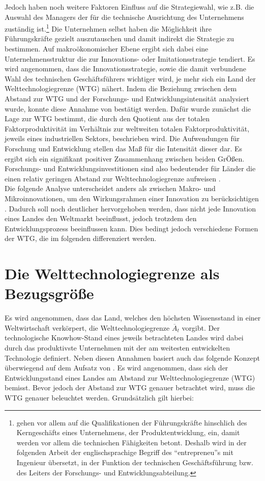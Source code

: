 %
Jedoch haben noch weitere Faktoren Einfluss auf die Strategiewahl, wie z.B. die Auswahl des Managers der für die technische Ausrichtung des Unternehmens zuständig ist.\footnote{\cite{Acemoglu.2006} gehen vor allem auf die Qualifikationen der Führungskräfte hinschlich des Kerngeschäfts eines Unternehmens, der Produktentwicklung, ein, damit werden vor allem die technischen Fähigkeiten betont. Deshalb wird in der folgenden Arbeit der englischsprachige Begriff des "`entrepreneu"'s mit Ingenieur übersetzt, in der Funktion der technischen Geschäftsführung bzw. des Leiters der Forschungs- und Entwicklungsabteilung.} Die Unternehmen selbst haben die Möglichkeit ihre Führungskräfte gezielt auszutauschen und damit indirekt die Strategie zu bestimmen. Auf makroökonomischer Ebene ergibt sich dabei eine Unternehmensstruktur die zur Innovations- oder Imitationsstrategie tendiert. 
%
Es wird angenommen, dass die Innovationsstrategie, sowie die damit verbundene Wahl des technischen Geschäftsführers wichtiger wird, je mehr sich ein Land der Welttechnologiegrenze (WTG) nähert. Indem die Beziehung zwischen dem Abstand zur WTG und der Forschungs- und Entwicklungsintensität analysiert wurde, konnte diese Annahme von \cite{Griffith.2004} bestätigt werden. Dafür wurde zunächst die Lage zur WTG bestimmt, die durch den Quotient aus der totalen Faktorproduktivität im Verhältnis zur weltweiten totalen Faktorproduktivität, jeweils eines industriellen Sektors, beschrieben wird. Die Aufwendungen für Forschung und Entwicklung stellen das Maß für die Intensität dieser dar. Es ergibt sich ein signifikant positiver Zusammenhang zwischen beiden GrÖßen. Forschungs- und Entwicklungsinvestitionen sind also bedeutender für Länder die einen relativ geringen Abstand zur Welttechnologiegrenze aufweisen \cite{Acemoglu.2006}.\\
%
Die folgende Analyse unterscheidet anders als \cite{Acemoglu.2006} zwischen Makro- und Mikroinnovationen, um den Wirkungsrahmen einer Innovation zu berücksichtigen \cite{Mokyr.1990}. Dadurch soll noch deutlicher hervorgehoben werden, dass nicht jede Innovation eines Landes den Weltmarkt beeinflusst, jedoch trotzdem den Entwicklungsprozess beeinflussen kann. Dies bedingt jedoch verschiedene Formen der WTG, die im folgenden differenziert werden.
%
\section{Die Welttechnologiegrenze als Bezugsgröße}\label{WTG}
%
Es wird angenommen, dass das Land, welches den höchsten Wissensstand in einer Weltwirtschaft verkörpert, die Welttechnologiegrenze $\overline {A}_t$ vorgibt. Der technologische Knowhow-Stand eines jeweils betrachteten Landes wird dabei durch das produktivste Unternehmen mit der am weitesten entwickelten Technologie definiert. 
Neben diesen Annahmen basiert auch das folgende Konzept überwiegend auf dem Aufsatz von \cite{Acemoglu.2006}. Es wird angenommen, dass sich der Entwicklungsstand eines Landes am Abstand zur Welttechnologiegrenze (WTG) bemisst. Bevor jedoch der Abstand zur WTG genauer betrachtet wird, muss die WTG genauer beleuchtet werden. Grundsätzlich gilt hierbei:

